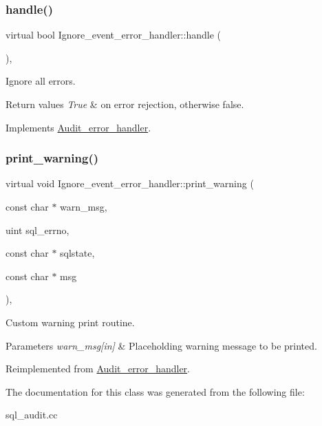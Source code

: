 \subsubsection{\texorpdfstring{handle()}{handle()}}
{\footnotesize\ttfamily virtual bool Ignore\+\_\+event\+\_\+error\+\_\+handler\+::handle (\begin{DoxyParamCaption}{ }\end{DoxyParamCaption})\hspace{0.3cm}{\ttfamily [inline]}, {\ttfamily [virtual]}}



Ignore all errors. 


\begin{DoxyRetVals}{Return values}
{\em True} & on error rejection, otherwise false. \\
\hline
\end{DoxyRetVals}


Implements \mbox{\hyperlink{classAudit__error__handler_aa674ae49782d768001e7bd1d11f16c68}{Audit\+\_\+error\+\_\+handler}}.

\mbox{\label{classIgnore__event__error__handler_a62ca182f5f8a5faebac36dccc8b5a01d}} 
\subsubsection{\texorpdfstring{print\+\_\+warning()}{print\_warning()}}
{\footnotesize\ttfamily virtual void Ignore\+\_\+event\+\_\+error\+\_\+handler\+::print\+\_\+warning (\begin{DoxyParamCaption}\item[{const char $\ast$}]{warn\+\_\+msg,  }\item[{uint}]{sql\+\_\+errno,  }\item[{const char $\ast$}]{sqlstate,  }\item[{const char $\ast$}]{msg }\end{DoxyParamCaption})\hspace{0.3cm}{\ttfamily [inline]}, {\ttfamily [virtual]}}



Custom warning print routine. 


\begin{DoxyParams}{Parameters}
{\em warn\+\_\+msg\mbox{[}in\mbox{]}} & Placeholding warning message to be printed. \\
\hline
\end{DoxyParams}


Reimplemented from \mbox{\hyperlink{classAudit__error__handler_ac3b06f010e4c72aee47ae6123e49ecc4}{Audit\+\_\+error\+\_\+handler}}.



The documentation for this class was generated from the following file\+:\begin{DoxyCompactItemize}
\item 
sql\+\_\+audit.\+cc\end{DoxyCompactItemize}
